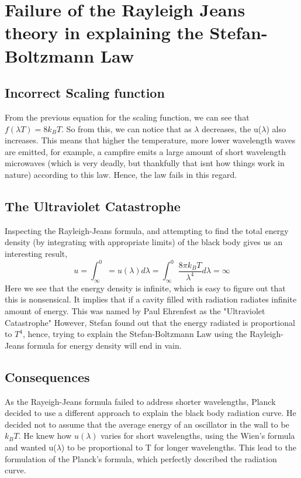 \section{Failure of the Rayleigh Jeans theory in explaining the Stefan-Boltzmann Law}
\subsection{Incorrect Scaling function}
From the previous equation for the scaling function, we can see that $f(\lambda T)=8k_BT$. So from this, we can notice that as $\lambda$ decreases, the u($\lambda$) also increases. This means that higher the temperature, more lower wavelength waves are emitted, for example, a campfire emits a large amount of short wavelength microwaves (which is very deadly, but thankfully that isnt how things work in nature) according to this law. Hence, the law fails in this regard.

\subsection{The Ultraviolet Catastrophe}
Inspecting the Rayleigh-Jeans formula, and attempting to find the total energy density (by integrating with appropriate limits) of the black body gives us an interesting result,
\begin{equation}
	u=\int_{\infty}^{0}=u(\lambda)d\lambda=\int_{\infty}^{0}\frac{8\pi k_B T}{\lambda^4}d\lambda=\infty
\end{equation}
Here we see that the energy density is infinite, which is easy to figure out that this is nonsensical. It implies that if a cavity filled with radiation radiates infinite amount of energy. This was named by Paul Ehrenfest as the "Ultraviolet Catastrophe" However, Stefan found out that the energy radiated is proportional to $T^4$, hence, trying to explain the Stefan-Boltzmann Law using the Rayleigh-Jeans formula for energy density will end in vain.
\subsection{Consequences}
As the Rayeigh-Jeans formula failed to address shorter wavelengths, Planck decided to use a different approach to explain the black body radiation curve. He decided not to assume that the average energy of an oscillator in the wall to be $k_BT$. He knew how $u(\lambda)$ varies for short wavelengths, using the Wien's formula and wanted u($\lambda$) to be proportional to T for longer wavelengths. This lead to the formulation of the Planck's formula, which perfectly described the radiation curve.
